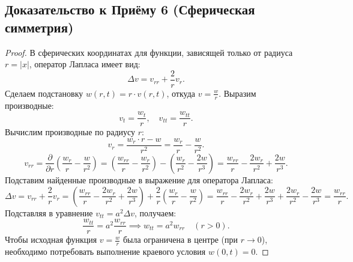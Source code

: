 \documentclass[a4paper,10pt]{article}
\begin{document}
\subsection*{Доказательство к Приёму 6 (Сферическая симметрия)}
\begin{proof}
В сферических координатах для функции, зависящей только от радиуса $r = |x|$, оператор Лапласа имеет вид:
\[ \Delta v = v_{rr} + \frac{2}{r}v_r. \]
Сделаем подстановку $w(r,t) = r \cdot v(r,t)$, откуда $v = \frac{w}{r}$. Выразим производные:
\[
v_t = \frac{w_t}{r}, \quad v_{tt} = \frac{w_{tt}}{r}.
\]
Вычислим производные по радиусу $r$:
\[
v_r = \frac{w_r \cdot r - w}{r^2} = \frac{w_r}{r} - \frac{w}{r^2}.
\]
\[
v_{rr} = \frac{\partial}{\partial r} \left( \frac{w_r}{r} - \frac{w}{r^2} \right) = \left( \frac{w_{rr}}{r} - \frac{w_r}{r^2} \right) - \left( \frac{w_r}{r^2} - \frac{2w}{r^3} \right) = \frac{w_{rr}}{r} - \frac{2w_r}{r^2} + \frac{2w}{r^3}.
\]
Подставим найденные производные в выражение для оператора Лапласа:
\[
\Delta v = v_{rr} + \frac{2}{r}v_r = \left( \frac{w_{rr}}{r} - \frac{2w_r}{r^2} + \frac{2w}{r^3} \right) + \frac{2}{r} \left( \frac{w_r}{r} - \frac{w}{r^2} \right) = \frac{w_{rr}}{r} - \frac{2w_r}{r^2} + \frac{2w}{r^3} + \frac{2w_r}{r^2} - \frac{2w}{r^3} = \frac{w_{rr}}{r}.
\]
Подставляя в уравнение $v_{tt} = a^2\Delta v$, получаем:
\[
\frac{w_{tt}}{r} = a^2 \frac{w_{rr}}{r} \implies w_{tt} = a^2 w_{rr} \quad (r>0).
\]
Чтобы исходная функция $v = \frac{w}{r}$ была ограничена в центре (при $r \to 0$), необходимо потребовать выполнение краевого условия $w(0, t) = 0$.
\end{proof}
\end{document}
